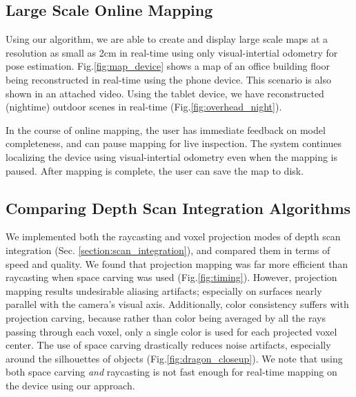 \documentclass[10pt,twocolumn,letterpaper]{article}
\newcommand{\figref}[1]{Fig.\ref{#1}}
\begin{document}
%  
%  
\subsection{Large Scale Online Mapping}
Using our algorithm, we are able to create and display large scale maps at a
resolution as small as 2cm in real-time using only visual-intertial odometry for
pose estimation. \figref{fig:map_device} shows a map of an office building floor
being reconstructed in real-time using the phone device. This scenario is also
shown in an attached video. Using the tablet device, we have reconstructed
(nightime) outdoor scenes in real-time (\figref{fig:overhead_night}).

In the course of online mapping, the user has immediate feedback on model
completeness, and can pause mapping for live inspection. The system continues
localizing the device using visual-intertial odometry even when the mapping is
paused. After mapping is complete, the user can save the map to disk.
 
\subsection{Comparing Depth Scan Integration Algorithms} 
We implemented both the raycasting and voxel projection modes of depth scan
integration (Sec. \ref{section:scan_integration}), and compared them in terms of
speed and quality. We found that projection mapping was far more efficient than
raycasting when space carving was used (\figref{fig:timing}). However,
projection mapping results undesirable aliasing artifacts; especially on
surfaces nearly parallel with the camera's visual axis. Additionally, color consistency suffers
with projection carving, because rather than color being averaged by all the
rays passing through each voxel, only a single color is used for each projected
voxel center. The use of space carving drastically reduces noise artifacts,
especially around the silhouettes of objects (\figref{fig:dragon_closeup}). We
note that using both space carving \emph{and} raycasting is not fast enough for real-time mapping on the device
using our approach.
\end{document}
